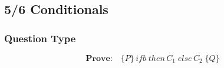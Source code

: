 \documentclass[10pt,landscape]{article}
\begin{document}
\begin{multicols*}{3}
\begin{enumerate}
\end{enumerate}
\subsection*{5/6 Conditionals}
\subsubsection*{Question Type}
\[\textbf{Prove:}\quad \{P\}\,if b\;then \,C_{1}\;else \,C_{2}\;\{Q\}\]

\end{multicols*}
\end{document}
